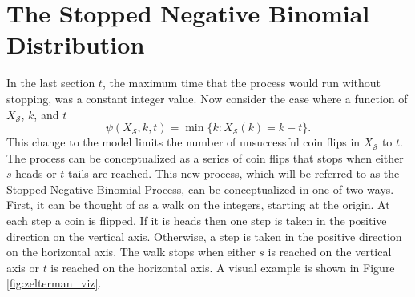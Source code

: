 \documentclass{article}
\newtheorem{prop}{Proposition}
\newcommand{\Xs}{X_\mathcal{S}}
\begin{document}



\section*{The Stopped Negative Binomial Distribution}

In the last section $t$, the maximum time that the process would
run without stopping, was a constant integer value. Now consider 
the case where a function of $X_\mathcal{S}$, $k$, and $t$
\begin{equation*}
\psi(\Xs, k, t) = \min\{k: \Xs(k) = k - t \}.
\end{equation*}
This change to the model limits the number of unsuccessful coin flips
in $\Xs$ to $t$. The process can be conceptualized as a series of coin
flips that stops when either $s$ heads or $t$ tails are reached. This
new process, which will be referred to as the Stopped Negative Binomial
Process, can be conceptualized in one of two ways. First, it can be thought of
as a walk on the integers, starting at the origin. At each step a coin is 
flipped. If it is heads then one step is taken in the positive direction 
on the vertical axis. Otherwise, a step is taken in the positive direction
on the horizontal axis. The walk stops when either $s$ is reached on the
vertical axis or $t$ is reached on the horizontal axis. A visual example 
is shown in Figure \ref{fig:zelterman_viz}.
\end{document}
